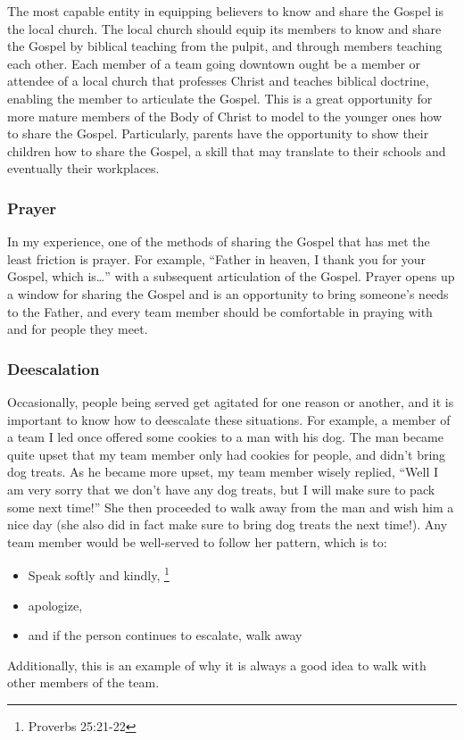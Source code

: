 \documentclass[12pt]{article}
\begin{document}
    \qGreatCommission
    The most capable entity in equipping believers to know and share the Gospel is the local church.
    The local church should equip its members to know and share the Gospel by biblical teaching from the pulpit, and through members teaching each other.
    Each member of a team going downtown ought be a member or attendee of a local church that professes Christ and teaches biblical doctrine, enabling the member to articulate the Gospel.
    This is a great opportunity for more mature members of the Body of Christ to model to the younger ones how to share the Gospel.
    Particularly, parents have the opportunity to show their children how to share the Gospel, a skill that may translate to their schools and eventually their workplaces.

\subsubsection{Prayer}

    In my experience, one of the methods of sharing the Gospel that has met the least friction is prayer.
    For example, ``Father in heaven, I thank you for your Gospel, which is\dots'' with a subsequent articulation of the Gospel.
    Prayer opens up a window for sharing the Gospel and is an opportunity to bring someone's needs to the Father, and every team member should be comfortable in praying with and for people they meet.

\subsubsection{Deescalation}

    Occasionally, people being served get agitated for one reason or another, and it is important to know how to deescalate these situations.
    For example, a member of a team I led once offered some cookies to a man with his dog.
    The man became quite upset that my team member only had cookies for people, and didn't bring dog treats.
    As he became more upset, my team member wisely replied, ``Well I am very sorry that we don't have any dog treats, but I will make sure to pack some next time!''
    She then proceeded to walk away from the man and wish him a nice day (she also did in fact make sure to bring dog treats the next time!).
    Any team member would be well-served to follow her pattern, which is to:
    \begin{itemize}
        \item Speak softly and kindly,
            \footnote{Proverbs 25:21-22}
        \item apologize,
        \item and if the person continues to escalate, walk away
    \end{itemize}
    Additionally, this is an example of why it is always a good idea to walk with other members of the team.
\end{document}
